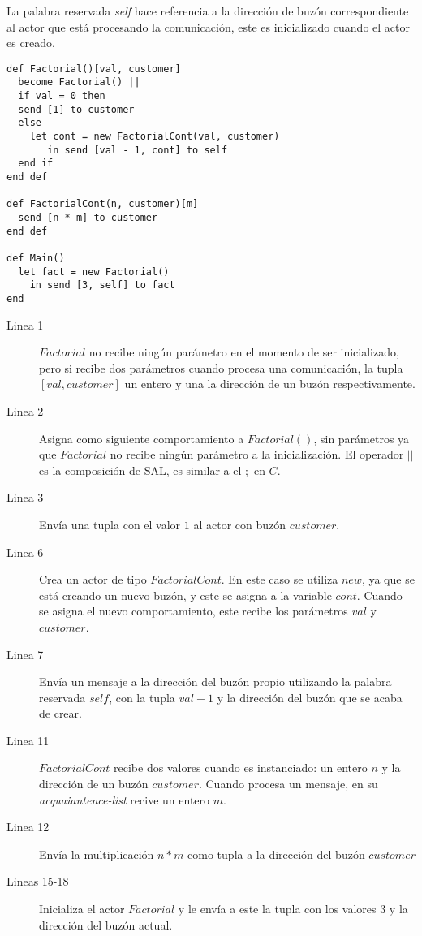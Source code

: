 La palabra reservada \textit{self} hace referencia a la dirección de buzón
correspondiente al actor que está procesando la comunicación, este es inicializado
cuando el actor es creado.

\begin{lstlisting}[language=sal, style=simple]
def Factorial()[val, customer]
  become Factorial() ||
  if val = 0 then
  send [1] to customer
  else
    let cont = new FactorialCont(val, customer)
       in send [val - 1, cont] to self
  end if 
end def

def FactorialCont(n, customer)[m] 
  send [n * m] to customer
end def

def Main() 
  let fact = new Factorial() 
    in send [3, self] to fact
end
\end{lstlisting}

\begin{description}

\item [Linea 1] $Factorial$ no recibe ningún parámetro en el momento de ser inicializado, pero si recibe dos parámetros cuando procesa una comunicación, la tupla $[val, customer]$ un entero y una la dirección de un buzón respectivamente.
\item [Linea 2] Asigna como siguiente comportamiento a $Factorial()$, sin parámetros ya que $Factorial$ no recibe ningún parámetro a la inicialización. El operador $||$ es la composición de SAL, es similar a el $;$ en $C$. 
\item [Linea 3] Envía una tupla con el valor $1$ al actor con buzón $customer$.
\item [Linea 6] Crea un actor de tipo $FactorialCont$. En este caso se utiliza $new$, ya que se está creando un nuevo buzón, y este se asigna a la variable $cont$. Cuando se asigna el nuevo comportamiento, este recibe los parámetros $val$ y $customer$.
\item [Linea 7] Envía un mensaje a la dirección del buzón propio utilizando la palabra reservada $self$, con la tupla $val - 1$ y la dirección del buzón que se acaba de crear.
\item [Linea 11] $FactorialCont$ recibe dos valores cuando es instanciado: un entero $n$ y la dirección de un buzón $customer$. Cuando procesa un mensaje, en su \textit{acquaiantence-list} recive un entero $m$.
\item [Linea 12] Envía la multiplicación $n*m$ como tupla a la dirección del buzón $customer$ 
\item [Lineas 15-18] Inicializa el actor $Factorial$ y le envía a este la tupla con los valores $3$ y la dirección del buzón actual. 

\end{description}


